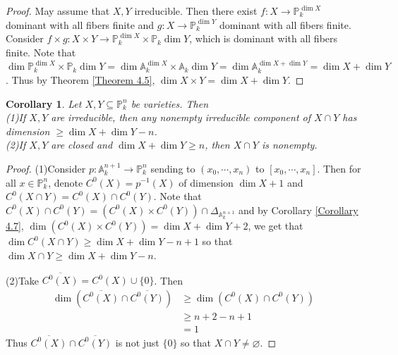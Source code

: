 \documentclass{ctexart}
\newtheorem{corollary}{Corollary}[section]
\begin{document}
\begin{proof}
    May assume that $X, Y$ irreducible.
    Then there exist $f: X \rightarrow \mathbb{P}_{k}^{\dim X}$ dominant with all fibers finite and $g: X \rightarrow \mathbb{P}_{k}^{\dim Y}$ dominant with all fibers finite.
    Consider $f \times g: X \times Y \rightarrow \mathbb{P}_{k}^{\dim X} \times \mathbb{P}_{k}{\dim Y}$,
    which is dominant with all fibers finite.
    Note that $\dim \mathbb{P}_{k}^{\dim X} \times \mathbb{P}_{k}{\dim Y} = \dim \mathbb{A}_{k}^{\dim X} \times \mathbb{A}_{k}{\dim Y} = \dim \mathbb{A}_{k}^{\dim X + \dim Y} = \dim X + \dim Y$.
    Thus by Theorem \ref{Theorem 4.5}, $\dim X \times Y = \dim X + \dim Y$.
\end{proof}
\begin{corollary}
    Let $X,Y \subseteq \mathbb{P}_{k}^{n}$ be varieties.
    Then \\
    (1)If $X, Y$ are irreducible, then any nonempty irreducible component of $X \cap Y$ has dimension $\ge \dim X + \dim Y - n$. \\
    (2)If $X, Y$ are closed and $\dim X + \dim Y \ge n$, then $X \cap Y$ is nonempty.
    \label{Corollary 4.8}
\end{corollary}
\begin{proof}
    (1)Consider $p: \mathbb{A}_{k}^{n + 1} \rightarrow \mathbb{P}_{k}^{n}$ sending to $(x_{0}, \cdots, x_{n})$ to $[x_{0}, \cdots, x_{n}]$.
    Then for all $x\in \mathbb{P}_{k}^{n}$, denote $C^{0}(X) = p^{-1}(X)$ of dimension $\dim X + 1$ and $C^{0}(X \cap Y) = C^{0}(X) \cap C^{0}(Y)$.
    Note that $C^{0}(X) \cap C^{0}(Y) = (C^{0}(X) \times C^{0}(Y)) \cap \Delta_{\mathbb{A}_{k}^{n + 1}}$ and by Corollary \ref{Corollary 4.7}, $\dim (C^{0}(X) \times C^{0}(Y)) = \dim X + \dim Y + 2$,
    we get that $\dim C^{0}(X \cap Y) \ge \dim X + \dim Y - n + 1$ so that $\dim X \cap Y \ge \dim X + \dim Y - n$.
    \par
    (2)Take $\overline{C^{0}(X)} = C^{0}(X) \cup \{0\}$.
    Then 
    \begin{equation}
        \begin{split}
            \dim (\overline{C^{0}(X)} \cap \overline{C^{0}(Y)}) & \ge \dim (C^{0}(X) \cap C^{0}(Y)) \\
            & \ge n + 2 - n + 1 \\
            & = 1
        \end{split}
    \end{equation}
    Thus $\overline{C^{0}(X)} \cap \overline{C^{0}(Y)}$ is not just $\{0\}$ so that $X \cap Y \neq \varnothing$.
\end{proof}
\end{document}
